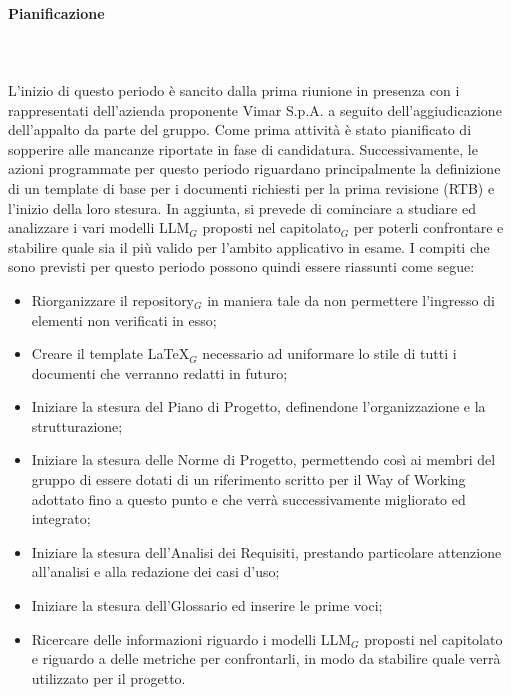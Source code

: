 \paragraph{Pianificazione} \hspace{1cm}
\\ \hspace{1cm} \\
L'inizio di questo periodo è sancito dalla prima riunione in presenza con i rappresentati dell'azienda proponente Vimar S.p.A. a seguito dell'aggiudicazione dell'appalto da parte del gruppo. Come prima attività è stato pianificato di sopperire alle mancanze riportate in fase di candidatura. Successivamente, le azioni programmate per questo periodo riguardano principalmente la definizione di un template di base per i documenti richiesti per la prima revisione (RTB) e l'inizio della loro stesura. In aggiunta, si prevede di cominciare a studiare ed analizzare i vari modelli LLM$_G$ proposti nel capitolato$_G$ per poterli confrontare e stabilire quale sia il più valido per l'ambito applicativo in esame.
I compiti che sono previsti per questo periodo possono quindi essere riassunti come segue:
\begin{itemize}
    \item Riorganizzare il repository$_G$ in maniera tale da non permettere l'ingresso di elementi non verificati in esso;
    \item Creare il template LaTeX$_G$ necessario ad uniformare lo stile di tutti i documenti che verranno redatti in futuro;
    \item Iniziare la stesura del Piano di Progetto, definendone l'organizzazione e la strutturazione;
    \item Iniziare la stesura delle Norme di Progetto, permettendo così ai membri del gruppo di essere dotati di un riferimento scritto per il Way of Working adottato fino a questo punto e che verrà successivamente migliorato ed integrato;
    \item Iniziare la stesura dell'Analisi dei Requisiti, prestando particolare attenzione all'analisi e alla redazione dei casi d'uso;
    \item Iniziare la stesura dell'Glossario ed inserire le prime voci;
    \item Ricercare delle informazioni riguardo i modelli LLM$_G$ proposti nel capitolato e riguardo a delle metriche per confrontarli, in modo da stabilire quale verrà utilizzato per il progetto.
\end{itemize}
